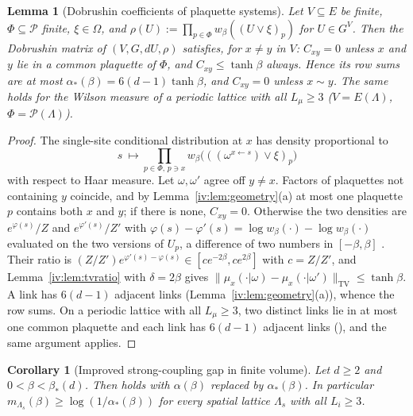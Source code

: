 \documentclass[11pt,a4paper]{article}
\newtheorem{lemma}[theorem]{Lemma}
\newtheorem{corollary}[theorem]{Corollary}
\theoremstyle{definition}
\theoremstyle{remark}
\newcommand{\cP}{\mathcal{P}}
\newcommand{\norm}[1]{\lVert #1\rVert}
\newcommand{\TV}{\mathrm{TV}}
\newcommand{\Fref}[3]{\cite[#1~`#2' (\texttt{#3})]{F}}
\newcommand{\Flab}[2]{\cite[#1 \texttt{#2}]{F}}
\newcommand{\Fname}[2]{\cite[#1~`#2']{F}}
\newcommand{\aS}{\alpha_*}
\newcommand{\bS}{\beta_*}
\begin{document}
\begin{lemma}[Dobrushin coefficients of plaquette systems]\label{iv:lem:coeff}
Let $V\subseteq E$ be finite, $\Phi\subseteq\cP$ finite, $\xi\in\Omega$, and $\rho(U):=\prod_{p\in\Phi}w_\beta((U\vee\xi)_p)$
for $U\in G^V$. Then the Dobrushin matrix of $(V,G,dU,\rho)$ satisfies, for $x\neq y$ in $V$: $C_{xy}=0$ unless $x$ and $y$ lie in
a common plaquette of $\Phi$, and $C_{xy}\le\tanh\beta$ always. Hence its row sums are at most $\aS(\beta)=6(d-1)\tanh\beta$, and
$C_{xy}=0$ unless $x\sim y$. The same holds for the Wilson measure of a periodic lattice with all $L_\mu\ge3$ ($V=E(\Lambda)$,
$\Phi=\cP(\Lambda)$).
\end{lemma}

\begin{proof}
The single-site conditional distribution at $x$ has density proportional to
\[
s\ \longmapsto\prod_{p\in\Phi,\,p\ni x}w_\beta\bigl(((\omega^{x\leftarrow s})\vee\xi)_p\bigr)
\]
with respect to Haar measure. Let $\omega,\omega'$ agree off $y\neq x$. Factors of plaquettes not containing $y$ coincide, and by
Lemma~\ref{iv:lem:geometry}(a) at most one plaquette $p$ contains both $x$ and $y$; if there is none, $C_{xy}=0$. Otherwise the
two densities are $e^{\varphi(s)}/Z$ and $e^{\varphi'(s)}/Z'$ with
$\varphi(s)-\varphi'(s)=\log w_\beta(\cdot)-\log w_\beta(\cdot)$ evaluated on the two versions of $U_p$, a difference of two numbers
in $[-\beta,\beta]$ \Flab{eq.}{eq:w}. Their ratio is $(Z/Z')e^{\varphi'(s)-\varphi(s)}\in[ce^{-2\beta},ce^{2\beta}]$ with
$c=Z/Z'$, and Lemma~\ref{iv:lem:tvratio} with $\delta=2\beta$ gives $\norm{\mu_x(\cdot|\omega)-\mu_x(\cdot|\omega')}_\TV\le\tanh\beta$.
A link has $6(d-1)$ adjacent links (Lemma~\ref{iv:lem:geometry}(a)), whence the row sums. On a periodic lattice with all
$L_\mu\ge3$, two distinct links lie in at most one common plaquette and each link has $6(d-1)$ adjacent links
(\Fname{Section}{Application to the Wilson measure}), and the same argument applies.
\end{proof}

\begin{corollary}[Improved strong-coupling gap in finite volume]\label{iv:cor:finitevol}
Let $d\ge2$ and $0<\beta<\bS(d)$. Then \Fref{Theorem}{Strong-coupling clustering and mass gap, uniform in the
volume}{thm:strong} holds with $\alpha(\beta)$ replaced by $\aS(\beta)$. In particular
$m_{\Lambda_s}(\beta)\ge\log(1/\aS(\beta))$ for every spatial lattice $\Lambda_s$ with all $L_i\ge3$.
\end{corollary}
\end{document}
